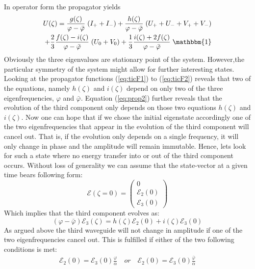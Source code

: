 \documentclass[9pt,twocolumn,twoside]{osajnl}
\begin{document}
In operator form the propagator yields
\begin{eqnarray}
U(\zeta)=\frac{g(\zeta)}{\varphi -\bar{\varphi}}\;(I_{+}+I_{-})
+\frac{h(\zeta)}{\varphi -\bar{\varphi}}\;(U_{+}+U_{-}+V_{+}+V_{-})
\nonumber\\
+\frac{2}{3}\frac{f(\zeta)-i(\zeta)}{\varphi -\bar{\varphi}}\;(U_{0}+V_{0})  
+\frac{1}{3}\frac{i(\zeta)+2f(\zeta)}{\varphi -\bar{\varphi}}\;\mathbbm{1}
\end{eqnarray}
\newline
Obviously the three eigenvalues are stationary point of the system. 
However,the particular symmetry of the system might allow for further
interesting states. \newline
Looking at the propagator functions (\ref{eq:ticF1}) to (\ref{eq:ticF2}) reveals that 
two of the equations, namely $h(\zeta)$ and $i(\zeta)$ depend on only two of the three
eigenfrequencies, $\varphi$ and $\bar{\varphi}$. Equation (\ref{eq:prop2}) further reveals that the 
evolution of the third component only depends on those two equations $h(\zeta)$ and $i(\zeta)$.
Now one can hope that if we chose the initial eigenstate accordingly one of the two 
eigenfrequencies that appear in the evolution of the third component will cancel out. That is, if
the evolution only depends on a single frequency, it will only change in phase and the 
amplitude will remain immutable. \newline
Hence, lets look for such a state where no energy transfer into or out of the third component occurs. Without loss of 
generality we can assume that the state-vector at a given time bears following form:
\begin{equation}
\mathcal{E}(\zeta=0)=\left( \begin{array}{c}
0 \\
\mathcal{E}_2(0) \\
\mathcal{E}_3(0)
\end{array} \right)	
\end{equation}   
Which implies that the third component evolves as:
\begin{equation}
(\varphi -\bar{\varphi})\mathcal{E}_3(\zeta) = h(\zeta)\mathcal{E}_2(0)
+i(\zeta)\mathcal{E}_3(0)
\end{equation}
As argued above the third waveguide will not change in amplitude if one of the 
two eigenfrequencies cancel out. This is fulfilled if either of the two following conditions
is met:
\begin{eqnarray}
\mathcal{E}_2(0)=\mathcal{E}_3(0)\frac{\varphi}{\alpha}\quad or \quad
\mathcal{E}_2(0)=\mathcal{E}_3(0)\frac{\bar{\varphi}}{\alpha}
\end{eqnarray}
\end{document}
